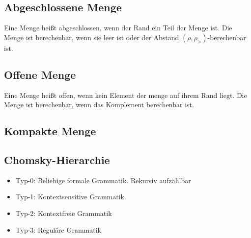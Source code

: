 \documentclass[ngerman]{scrartcl}
\begin{document}
\subsection{Abgeschlossene Menge}
Eine Menge heißt abgeschlossen, wenn der Rand ein Teil der Menge ist. Die Menge ist berechenbar, wenn sie leer ist oder der Abstand $ (\rho, \rho_>) $-berechenbar ist.

\subsection{Offene Menge}
Eine Menge heißt offen, wenn kein Element der menge auf ihrem Rand liegt. Die Menge ist berechenbar, wenn das Komplement berechenbar ist.

\subsection{Kompakte Menge}

\subsection{Chomsky-Hierarchie}
\begin{itemize}
  \item Typ-0: Beliebige formale Grammatik. Rekursiv aufzählbar
  \item Typ-1: Kontextsensitive Grammatik
  \item Typ-2: Kontextfreie Grammatik
  \item Typ-3: Reguläre Grammatik
\end{itemize}




%
%
%
%
\end{document}
